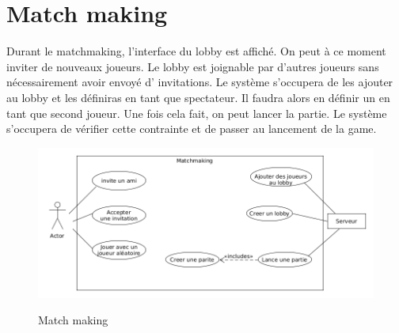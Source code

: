 \documentclass[../besoin_sys.tex]{subfiles}
\begin{document}
\section{Match making}

Durant le matchmaking, l'interface du lobby est affiché. On peut à ce moment inviter de nouveaux joueurs. 
Le lobby est joignable par d'autres joueurs sans nécessairement avoir envoyé d' invitations.
Le système s'occupera de les ajouter au lobby et les définiras en tant que spectateur.
Il faudra alors en définir un en tant que second joueur. Une fois cela fait, on peut lancer la partie.
Le système s'occupera de vérifier cette contrainte et de passer au lancement de la game.

\begin{figure}[h]
    \centering
    \includegraphics[scale=0.6]{img_fonctionnel/usecas_sys_matchmaking.png}
    \label{fig:sys_matchmaking}
    \caption{Match making}
\end{figure}
\end{document}
